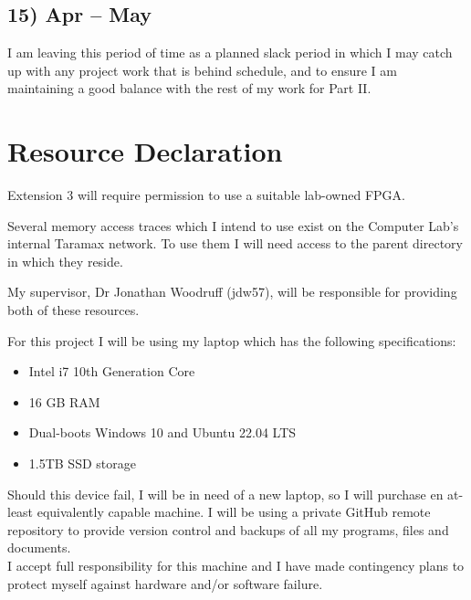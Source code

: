 \documentclass[10pt,a4paper]{article}
\begin{document}
\subsection*{15)  Apr --  May}
I am leaving this period of time as a planned slack period in which I may catch up with any project work that is behind schedule, and to ensure I am maintaining a good balance with the rest of my work for Part II.

\section*{Resource Declaration}

Extension 3 will require permission to use a suitable lab-owned FPGA.

Several memory access traces which I intend to use exist on the Computer Lab's internal Taramax network. To use them I will need access to the parent directory in which they reside.

My supervisor, Dr Jonathan Woodruff (jdw57), will be responsible for providing both of these resources.

For this project I will be using my laptop which has the following specifications:
\begin{itemize}
	\item Intel i7 10th Generation Core
	\item 16 GB RAM
	\item Dual-boots Windows 10 and Ubuntu 22.04 LTS
	\item 1.5TB SSD storage
\end{itemize}
Should this device fail, I will be in need of a new laptop, so I will purchase en at-least equivalently capable machine. I will be using a private GitHub remote repository to provide version control and backups of all my programs, files and documents.\\
I accept full responsibility for this machine and I have made contingency plans to protect myself against hardware and/or software failure.

\printbibliography[category=mandatory]
\end{document}
